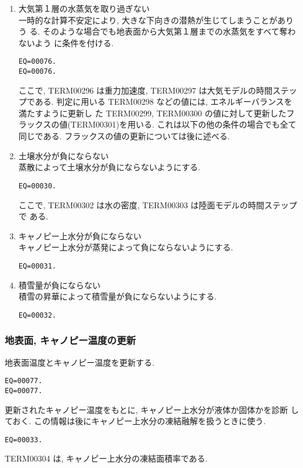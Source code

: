 \begin{enumerate}
 \item 大気第１層の水蒸気を取り過ぎない \\
 一時的な計算不安定により, 大きな下向きの潜熱が生じてしまうことがありう
 る.
 そのような場合でも地表面から大気第１層までの水蒸気をすべて奪わないよう
 に条件を付ける.
 \begin{verbatim}
EQ=00076.
EQ=00076.
\end{verbatim}
  ここで, TERM00296 は重力加速度, TERM00297 は大気モデルの時間ステップである.
  判定に用いる TERM00298 などの値には, エネルギーバランスを満たすように更新し
  た TERM00299, TERM00300 の値に対して更新したフラックスの値(TERM00301)を用いる.
  これは以下の他の条件の場合でも全て同じである.
  フラックスの値の更新については後に述べる.
 \item 土壌水分が負にならない \\
  蒸散によって土壌水分が負にならないようにする.
  \begin{verbatim}
EQ=00030.
\end{verbatim}
  ここで, TERM00302 は水の密度, TERM00303 は陸面モデルの時間ステップで
  ある.
 \item キャノピー上水分が負にならない \\
  キャノピー上水分が蒸発によって負にならないようにする.
  \begin{verbatim}
EQ=00031.
\end{verbatim}
 \item 積雪量が負にならない \\
  積雪の昇華によって積雪量が負にならないようにする.
  \begin{verbatim}
EQ=00032.
\end{verbatim}
\end{enumerate}

\subsubsection{地表面, キャノピー温度の更新}

  地表面温度とキャノピー温度を更新する.
\begin{verbatim}
EQ=00077.
EQ=00077.
\end{verbatim}

  更新されたキャノピー温度をもとに, キャノピー上水分が液体か固体かを診断
  しておく. この情報は後にキャノピー上水分の凍結融解を扱うときに使う.

\begin{verbatim}
EQ=00033.
\end{verbatim}
TERM00304 は, キャノピー上水分の凍結面積率である.

